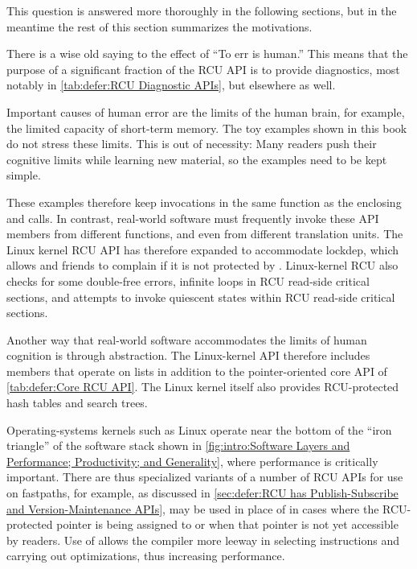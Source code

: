 This question is answered more thoroughly in the following sections,
but in the meantime the rest of this section summarizes the motivations.

There is a wise old saying to the effect of ``To err is human.''
This means that the purpose of a significant fraction of the RCU API is to
provide diagnostics, most notably in \cref{tab:defer:RCU Diagnostic APIs},
but elsewhere as well.

Important causes of human error are the limits of the human brain,
for example, the limited capacity of short-term memory.
The toy examples shown in this book do not stress these limits.
This is out of necessity:
Many readers push their cognitive limits while learning new material,
so the examples need to be kept simple.

These examples therefore keep  invocations
in the same function as the enclosing  and
 calls.
In contrast, real-world software must frequently invoke these API members
from different functions, and even from different translation units.
The Linux kernel RCU API has therefore expanded to accommodate lockdep,
which allows  and friends to complain if it is
not protected by .
Linux-kernel RCU also checks for some double-free errors, infinite
loops in RCU read-side critical sections, and attempts to invoke
quiescent states within RCU read-side critical sections.

Another way that real-world software accommodates the limits of human
cognition is through abstraction.
The Linux-kernel API therefore includes members that operate on lists
in addition to the pointer-oriented core API of
\cref{tab:defer:Core RCU API}.
The Linux kernel itself also provides RCU-protected hash tables and
search trees.

Operating-systems kernels such as Linux operate near the bottom of the
``iron triangle'' of the software stack shown in
\cref{fig:intro:Software Layers and Performance; Productivity; and Generality},
where performance is critically important.
There are thus specialized variants of a number of RCU APIs for use on
fastpaths, for example, as discussed in
\cref{sec:defer:RCU has Publish-Subscribe and Version-Maintenance APIs},
 may be used in
place of  in cases where the RCU-protected pointer
is being assigned to  or when that pointer is not yet accessible
by readers.
Use of  allows the compiler more leeway in
selecting instructions and carrying out optimizations, thus increasing
performance.

